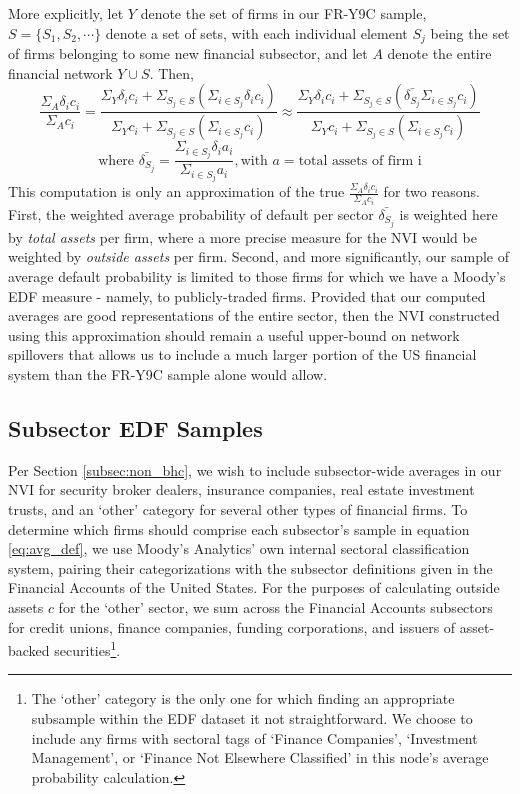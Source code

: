 More explicitly, let $Y$ denote the set of firms in our FR-Y9C sample, $S = \{S_1, S_2, \cdots\}$ denote a set of sets, with each individual element $S_j$ being the set of firms belonging to some new financial subsector, and let $A$ denote the entire financial network $Y \cup S$. Then, 
\begin{equation}\label{eq:approx}
\frac{\Sigma_{A} \delta_i c_i}{\Sigma_A c_i} = \frac{\Sigma_Y \delta_i c_i+ \Sigma_{S_j \in S}(\Sigma_{i \in S_j } \delta_ic_i)}{{\Sigma_Y c_i}  + \Sigma_{S_j \in S}(\Sigma_{i \in S_j}c_i)} \approx \frac{\Sigma_Y \delta_i c_i+ \Sigma_{S_j \in S}(\bar{\delta_{S_j}}\Sigma_{i \in S_j} c_i)}{{\Sigma_Y c_i} + \Sigma_{S_j \in S}(\Sigma_{i \in S_j}c_i)} 
\end{equation}
\begin{equation}
\text{where } \bar{\delta_{S_j}} = \frac{\Sigma_{i \in S_j} \delta_i a_i}{\Sigma_{i \in S_j}a_i}, \text{with } a = \text{total assets of firm i} \label{eq:avg_def}
\end{equation}
This computation is only an approximation of the true $\frac{\Sigma_{A} \delta_i c_i}{\Sigma_A c_i}$ for two reasons. First, the weighted average probability of default per sector $\bar{\delta_{S_j}}$ is weighted here by \textit{total assets} per firm, where a more precise measure for the NVI would be weighted by \textit{outside assets} per firm. Second, and more significantly, our sample of average default probability is limited to those firms for which we have a Moody's EDF measure - namely, to publicly-traded firms. Provided that our computed averages are good representations of the entire sector, then the NVI constructed using this approximation should remain a useful upper-bound on network spillovers that allows us to include a much larger portion of the US financial system than the FR-Y9C sample alone would allow.

\subsection{Subsector EDF Samples}

Per Section \ref{subsec:non_bhc}, we wish to include subsector-wide averages in our NVI for security broker dealers, insurance companies, real estate investment trusts, and an `other' category for several other types of financial firms. To determine which firms should comprise each subsector's sample in equation \ref{eq:avg_def}, we use Moody's Analytics' own internal sectoral classification system, pairing their categorizations with the subsector definitions given in the Financial Accounts of the United States. For the purposes of calculating outside assets $c$ for the `other' sector, we sum across the Financial Accounts subsectors for credit unions, finance companies, funding corporations, and issuers of asset-backed securities\footnote{The `other' category is the only one for which finding an appropriate subsample within the EDF dataset it not straightforward. We choose to include any firms with sectoral tags of `Finance Companies', `Investment Management', or `Finance Not Elsewhere Classified' in this node's average probability calculation.}.

